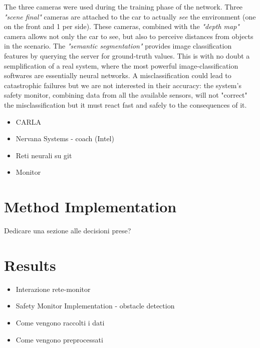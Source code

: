 The three cameras were used during the training phase of the network. Three \textsl{"scene final"} cameras are attached to the car to actually \textsl{see} the environment (one on the front and 1 per side). These cameras, combined with the \textsl{"depth map"} camera allows not only the car to see, but also to perceive distances from objects in the scenario.
The \textsl{"semantic segmentation"} provides image classification features by querying the server for ground-truth values. This is with no doubt a semplification of a real system, where the most powerful image-classification softwares are essentially neural networks. A misclassification could lead to catastrophic failures but we are not interested in their accuracy: the system's safety monitor, combining data from all the available sensors, will not "correct" the misclassification but it must react fast and safely to the consequences of it.




\begin{itemize}
	\item CARLA
	\item Nervana Systems - coach (Intel)
	\item Reti neurali su git
	\item Monitor
\end{itemize}


\section{Method Implementation}

Dedicare una sezione alle decisioni prese?

\section{Results}

\begin{itemize}
	
	\item Interazione rete-monitor
	\item Safety Monitor Implementation - obstacle detection
	\item Come vengono raccolti i dati
	\item Come vengono preprocessati
	
\end{itemize}

